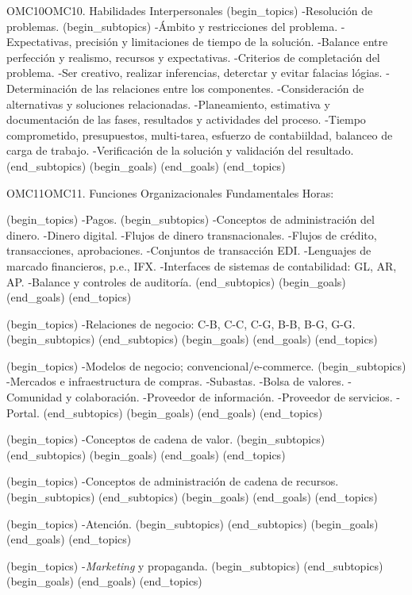 \begin{BKL2}{OMC10}{OMC10. Habilidades Interpersonales}
(begin_topics)
-Resolución de problemas.
(begin_subtopics)
-Ámbito y restricciones del problema.
-Expectativas, precisión y limitaciones de tiempo de la solución.
-Balance entre perfección y realismo, recursos y expectativas.
-Criterios de completación del problema.
-Ser creativo, realizar inferencias, deterctar y evitar falacias lógias.
-Determinación de las relaciones entre los componentes.
-Consideración de alternativas y soluciones relacionadas.
-Planeamiento, estimativa y documentación de las fases, resultados y actividades del proceso.
-Tiempo comprometido, presupuestos, multi-tarea, esfuerzo de contabiildad, balanceo de carga de trabajo.
-Verificación de la solución y validación del resultado.
(end_subtopics)
(begin_goals)
(end_goals)
(end_topics)
\end{BKL2}

\begin{BKL2}{OMC11}{OMC11. Funciones Organizacionales Fundamentales}
Horas:
 
(begin_topics)
-Pagos.
(begin_subtopics)
-Conceptos de administración del dinero.
-Dinero digital.
-Flujos de dinero transnacionales.
-Flujos de crédito, transacciones, aprobaciones.
-Conjuntos de transacción EDI.
-Lenguajes de marcado financieros, p.e., IFX.
-Interfaces de sistemas de contabilidad: GL, AR, AP.
-Balance y controles de auditoría.
(end_subtopics)
(begin_goals)
(end_goals)
(end_topics)

 

(begin_topics)
-Relaciones de negocio: C-B, C-C, C-G, B-B, B-G, G-G.
(begin_subtopics)
(end_subtopics)
(begin_goals)
(end_goals)
(end_topics)

 
(begin_topics)
-Modelos de negocio; convencional/e-commerce.
(begin_subtopics)
-Mercados e infraestructura de compras.
-Subastas.
-Bolsa de valores.
-Comunidad y colaboración.
-Proveedor de información.
-Proveedor de servicios.
-Portal.
(end_subtopics)
(begin_goals)
(end_goals)
(end_topics)

 
(begin_topics)
-Conceptos de cadena de valor.
(begin_subtopics)
(end_subtopics)
(begin_goals)
(end_goals)
(end_topics)

 
(begin_topics)
-Conceptos de administración de cadena de recursos.
(begin_subtopics)
(end_subtopics)
(begin_goals)
(end_goals)
(end_topics)

 
(begin_topics)
-Atención.
(begin_subtopics)
(end_subtopics)
(begin_goals)
(end_goals)
(end_topics)

 
(begin_topics)
-{\it Marketing} y propaganda.
(begin_subtopics)
(end_subtopics)
(begin_goals)
(end_goals)
(end_topics)


\end{BKL2}
